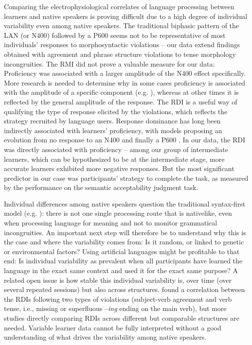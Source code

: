\documentclass[output=paper,colorlinks,citecolor=brown,modfonts,nonflat]{../langscibook}
\begin{document}
Comparing the electrophysiological correlates of language processing between learners and native speakers is proving difficult due to a high degree of individual variability even among native speakers. The traditional biphasic pattern of the LAN (or N400) followed by a P600 seems not to be representative of most individuals’ responses to morphosyntactic violations – our data extend findings obtained with agreement and phrase structure violations to tense morphology incongruities. The RMI did not prove a valuable measure for our data: Proficiency was associated with a larger amplitude of the N400 effect specifically. More research is needed to determine why in some cases proficiency is associated with the amplitude of a specific component (e.g. \citealt{TannerEtAl2009,TannerEtAl2013,WhiteEtAl2012}), whereas at other times it is reflected by the general amplitude of the response. The RDI is a useful way of qualifying the type of response elicited by the violations, which reflects the strategy recruited by language users. Response dominance has long been indirectly associated with learners’ proficiency, with models proposing an evolution from no response to an N400 and finally a P600 \citep{SteinhauerEtAl2009}. In our data, the RDI was directly associated with proficiency – among our group of intermediate learners, which can be hypothesized to be at the intermediate stage, more accurate learners exhibited more negative responses. But the most significant predictor in our case was participants’ strategy to complete the task, as measured by the performance on the semantic acceptability judgment task.

Individual differences among native speakers question the traditional syntax-first model (e.g. \citealt{Friederici2002}): there is not one single processing route that is nativelike, even when processing language for meaning and not to monitor grammatical incongruities. An important next step will therefore be to understand why this is the case and where the variability comes from: Is it random, or linked to genetic or environmental factors? Using artificial languages might be profitable to that end: Is individual variability as prevalent when all participants have learned the language in the exact same context and used it for the exact same purpose?  A related open issue is how stable this individual variability is, over time (over several repeated sessions) but also across structures. \citet{TannerHell2014} found a correlation between the RDIs following two types of violations (subject-verb agreement and verb tense, i.e., missing or superfluous –\textit{ing} ending on the main verb), but more studies directly comparing RDIs across different but comparable structures are needed. Variable learner data cannot be fully interpreted without a good understanding of what drives the variability among native speakers.
\end{document}
